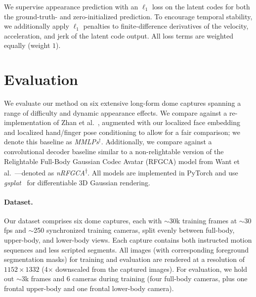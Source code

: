 \documentclass[runningheads]{llncs}
\begin{document}
We supervise appearance prediction with an $\ell_1$ loss on the latent codes for both the ground-truth- and zero-initialized prediction.
To encourage temporal stability, we additionally apply $\ell_1$ penalties to finite-difference derivatives of the velocity, acceleration, and jerk of the latent code output.
All loss terms are weighted equally (weight $1$).



\section{Evaluation}

We evaluate our method on six extensive long-form dome captures spanning a range of difficulty and dynamic appearance effects.
We compare against a re-implementation of Zhan et al.~\cite{zhan2025spatialmlps}, augmented with our localized face embedding and localized hand/finger pose conditioning to allow for a fair comparison; we denote this baseline as \emph{MMLPs$^\dagger$}.
Additionally, we compare against a convolutional decoder baseline similar to a non-relightable version of the Relightable Full-Body Gaussian Codec Avatar (RFGCA) model from Want et al.~\cite{wang2025relightable}---denoted as \emph{nRFGCA\textsuperscript{$\dagger$}}.
All models are implemented in PyTorch and use \emph{gsplat}~\cite{ye2025gsplat} for differentiable 3D Gaussian rendering.

\paragraph{Dataset.}

Our dataset comprises six dome captures, each with ${\sim}$30k training frames at ${\sim}$30\,fps and ${\sim}$250 synchronized training cameras, split evenly between full-body, upper-body, and lower-body views.
Each capture contains both instructed motion sequences and less scripted segments.
All images (with corresponding foreground segmentation masks) for training and evaluation are rendered at a resolution of $1152\times1332$ (4${\times}$ downscaled from the captured images).
For evaluation, we hold out ${\sim}$3k frames and 6 cameras during training (four full-body cameras, plus one frontal upper-body and one frontal lower-body camera).
\end{document}
